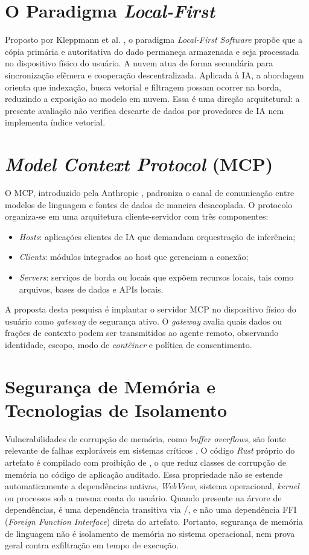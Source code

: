 \documentclass[12pt,openright,twoside,a4paper,english,brazil]{abntex2}
\begin{document}
\section{O Paradigma \textit{Local-First}}
Proposto por Kleppmann et al. \cite{kleppmann2019}, o paradigma \textit{Local-First Software} propõe que a cópia primária e autoritativa do dado permaneça armazenada e seja processada no dispositivo físico do usuário. A nuvem atua de forma secundária para sincronização efêmera e cooperação descentralizada. Aplicada à IA, a abordagem orienta que indexação, busca vetorial e filtragem possam ocorrer na borda, reduzindo a exposição ao modelo em nuvem. Essa é uma direção arquitetural: a presente avaliação não verifica descarte de dados por provedores de IA nem implementa índice vetorial.

\section{\textit{Model Context Protocol} (MCP)}
O MCP, introduzido pela Anthropic \cite{anthropic2024}, padroniza o canal de comunicação entre modelos de linguagem e fontes de dados de maneira desacoplada. O protocolo organiza-se em uma arquitetura cliente-servidor com três componentes:
\begin{itemize}
\item \textit{Hosts}: aplicações clientes de IA que demandam orquestração de inferência;
\item \textit{Clients}: módulos integrados ao host que gerenciam a conexão;
\item \textit{Servers}: serviços de borda ou locais que expõem recursos locais, tais como arquivos, bases de dados e APIs locais.
\end{itemize}
A proposta desta pesquisa é implantar o servidor MCP no dispositivo físico do usuário como \textit{gateway} de segurança ativo. O \textit{gateway} avalia quais dados ou frações de contexto podem ser transmitidos ao agente remoto, observando identidade, escopo, modo de \textit{contêiner} e política de consentimento.

\section{Segurança de Memória e Tecnologias de Isolamento}
Vulnerabilidades de corrupção de memória, como \textit{buffer overflows}, são fonte relevante de falhas exploráveis em sistemas críticos \cite{nsa2022}. O código \textit{Rust} próprio do artefato é compilado com proibição de , o que reduz classes de corrupção de memória no código de aplicação auditado. Essa propriedade não se estende automaticamente a dependências nativas, \textit{WebView}, sistema operacional, \textit{kernel} ou processos sob a mesma conta do usuário. Quando presente na árvore de dependências,  é uma dependência transitiva via /, e não uma dependência FFI (\textit{Foreign Function Interface}) direta do artefato. Portanto, segurança de memória de linguagem não é isolamento de memória no sistema operacional, nem prova geral contra exfiltração em tempo de execução.
\end{document}
